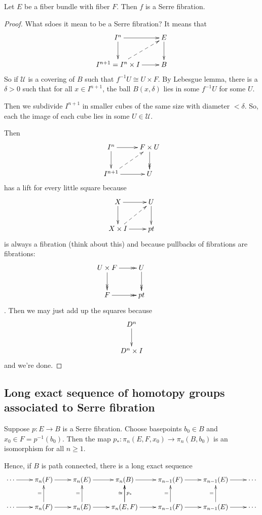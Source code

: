 \begin{proposition}[Hatcher, 4.48]
\label{proposition-hatcher-4-48}
	Let $E$ be a fiber bundle with fiber $F$.
	Then $f$ is a Serre fibration.
\end{proposition}
\begin{proof}
	What sdoes it mean to be a Serre fibration?
	It means that
	$$
	\xymatrix{
		I^n\ar[r]\ar[d]&E\ar[d]\\
		I^{n+1}=I^n\times I\ar[r]\ar@{-->}[ur]&B
	}
	$$
	So if $\mathcal{U}$ is a covering of $B$
	such that $f^{-1}U\cong U\times F$. By
	Lebesgue lemma, there is a $\delta>0$ such
	that for all $x\in I^{n+1}$, the ball
	$B(x,\delta)$ lies in some $f^{-1}U$ for
	some $U$.

	Then we subdivide $I^{n+1}$ in smaller cubes
	of the same size with diameter $<\delta$.
	So, each the image of each cube lies in some
	$U\in\mathcal{U}$.

	Then
	$$
	\xymatrix{
		I^n\ar[d]\ar[r]&F\times U\ar@{->>}[d]\\
		I^{n+1}\ar[r]\ar@{-->}[ur]&U
	}
	$$
	has a lift for every little square because
	$$
	\xymatrix{
		X\ar[r]\ar[d]&U\ar[d]\\
		X\times I\ar[r]\ar@{-->}[ur]&pt
	}
	$$
	is always a fibration (think about this) and
	because pullbacks of fibrations are
	fibrations:
	$$
	\xymatrix{
		U\times
		F\ar@{->>}[r]\ar@{->>}[d]&U\ar@{->>}[d]&\\
		F\ar@{->>}[r]&pt
	}
	$$.
	Then we may just add up the squares because
	$$
	\xymatrix{
		D^n\ar[d]\\
		D^n\times I
	}
	$$
	and we're done.
\end{proof}

\subsection{Long exact sequence of homotopy
groups associated to Serre fibration}
\label{subsection-long-exact-seque-homot}
\begin{theorem}[Hatcher 4.41]
\label{theorem-hatcher-4-41}
	Suppose $p:E\to B$ is a Serre fibration.
	Choose basepoints $b_{0}\in B$ and $x_{0}\in
	F=p^{-1}(b_{0})$. Then the map
	$p_{*}:\pi_{n}(E,F,x_{0})\to
	\pi_{n}(B,b_{0})$ is an isomorphism for all
	$n\geq 1$.

	Hence, if $B$ is path connected, there is a
	long exact sequence
$$
\xymatrix{
	\cdots\ar[r]&\pi_n(F)\ar[r]&\pi_n(E)\ar[r]
	&\pi_n(B)\ar[r]&\pi_{n-1}(F)\ar[r]
	&\pi_{n-1}(E)\ar[r]&\cdots\\
	\cdots\ar[r]&\pi_n(F)\ar[r]\ar[u]^{=}
	&\pi_n(E)\ar[r]\ar[u]^{=}
	&\pi_n(E,F)\ar[r]\ar[u]^{\cong}\ar[u]_{p_{*}
	}
	&\pi_{n-1}(F)\ar[r]\ar[u]^{=}
	&\pi_{n-1}(E)\ar[r]\ar[u]^{=}&\cdots
}
$$
\end{theorem}

